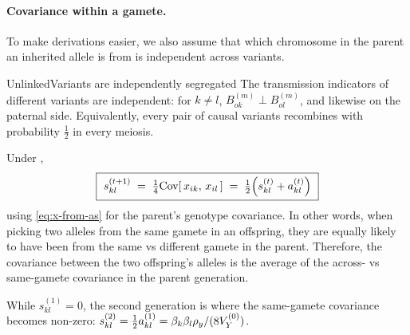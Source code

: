 \documentclass[12pt]{article}
\begin{document}
\paragraph{Covariance within a gamete.}
To make derivations easier, we also assume that which chromosome in the parent an inherited allele is from is independent across variants.

\begin{assumption}{Unlinked}{Variants are independently segregated}
The transmission indicators of different variants are independent: for $k \neq l$, $B^{(m)}_{ok} \perp B^{(m)}_{ol}$, and likewise on the paternal side.
Equivalently, every pair of causal variants recombines with probability $\tfrac12$ in every meiosis.
\end{assumption}

Under ,
\begin{equation}\label{eq:s-recursion}
    \boxed{\ s^{(t+1)}_{kl} \;=\; \tfrac14 \mathrm{Cov}[\,x_{ik},\, x_{il}\,] \;=\; \tfrac12\Big(s^{(t)}_{kl} + a^{(t)}_{kl}\Big) \ }
\end{equation}
using \eqref{eq:x-from-as} for the parent's genotype covariance.
In other words, when picking two alleles from the same gamete in an offspring, they are equally likely to have been from the same vs different gamete in the parent.
Therefore, the covariance between the two offspring's alleles is the average of the across- vs same-gamete covariance in the parent generation.

While $s^{(1)}_{kl} = 0$, the second generation is where the same-gamete covariance becomes non-zero: $s^{(2)}_{kl} = \tfrac12 a^{(1)}_{kl} = \beta_k\beta_l\rho_y/(8V_Y^{(0)})$.
\end{document}
